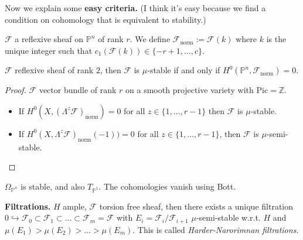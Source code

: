 Now we explain some {\bf easy criteria.} (I think it's easy because we find a
condition on cohomology that is equivalent to stability.)

\begin{definition}
\label{definition-norm-sheaf}
$\mathcal{F}$ a reflexive sheaf on $\mathbb{P}^n$ of rank $r$. We define
$\mathcal{F}_{\text{norm}}:=\mathcal{F}(k)$ where $k$ is the unique integer such
that $c_1(\mathcal{F}(k))\in \{-r+1,\ldots,c\}$.
\end{definition}

\begin{proposition}
\label{proposition-cohomological-characterization-of-stability}
$\mathcal{F}$ reflexive sheaf of rank  $2$, then $\mathcal{F}$ is $\mu$-stable
if and only if $H^{0}(\mathbb{P}^n,\mathcal{F}_{\text{norm}})=0$.
\end{proposition}

\begin{proof}
$\mathcal{F}$ vector bundle of rank $r$ on a smooth projective variety with
$\text{Pic}=\mathbb{Z}$.
\begin{itemize}
\item If $H^{0}(X,(\Lambda^{z}\mathcal{F})_{\text{norm}})=0$ for all $z \in
\{1,\ldots,r-1\}$ then $\mathcal{F}$ is $\mu$-stable.
\item If $H^{0}(X,\Lambda^{z}\mathcal{F})_{\text{norm}}(-1))=0$ for all $z \in
\{1,\ldots,r-1\}$, then $\mathcal{F}$ is $\mu$-semi-stable.
\end{itemize}
\end{proof}

\begin{example}
\label{example-Omega1-on-projective-space-is-stable}
$\Omega_{\mathbb{P}^n}$ is stable, and also $T_{\mathbb{P}^1}$. The cohomologies
vanish using Bott.
\end{example}

\begin{example}
\label{example-lots-of-Os}

\end{example}

{\bf Filtrations.} $H$ ample, $\mathcal{F}$ torsion free sheaf, then there
exists a unique filtration $0 \hookrightarrow  \mathcal{F}_0\subset
\mathcal{F}_1\subset\ldots\subset\mathcal{F}_m=\mathcal{F}$ with
$E_i=\mathcal{F}_i/\mathcal{F}_{i+1}$ $\mu$-semi-stable w.r.t. $H$ and
$\mu(E_1)>\mu(E_2)>\ldots>\mu(E_m)$. This is called {\it Harder-Narorimnan
filtrations}.

